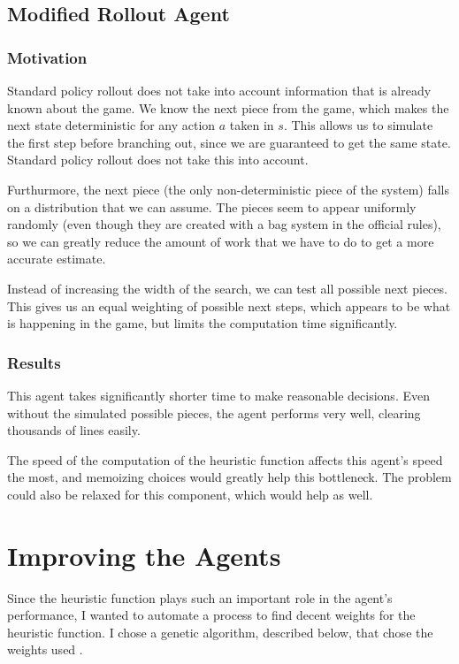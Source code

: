 \documentclass{article}
\begin{document}
\subsection{Modified Rollout Agent}
\subsubsection{Motivation}
Standard policy rollout does not take into account information that is already known about the game. We know the next piece from the game, which makes the next state deterministic for any action $a$ taken in $s$. This allows us to simulate the first step before branching out, since we are guaranteed to get the same state. Standard policy rollout does not take this into account.

Furthurmore, the next piece (the only non-deterministic piece of the system) falls on a distribution that we can assume. The pieces seem to appear uniformly randomly (even though they are created with a bag system in the official rules), so we can greatly reduce the amount of work that we have to do to get a more accurate estimate.

Instead of increasing the width of the search, we can test all possible next pieces. This gives us an equal weighting of possible next steps, which appears to be what is happening in the game, but limits the computation time significantly.

\subsubsection{Results}
This agent takes significantly shorter time to make reasonable decisions. Even without the simulated possible pieces, the agent performs very well, clearing thousands of lines easily.

The speed of the computation of the heuristic function affects this agent's speed the most, and memoizing choices would greatly help this bottleneck. The problem could also be relaxed for this component, which would help as well.

\section{Improving the Agents}
Since the heuristic function plays such an important role in the agent's performance, I wanted to automate a process to find decent weights for the heuristic function. I chose a genetic algorithm, described below, that chose the weights used \cite{geneticideas}.
\end{document}
